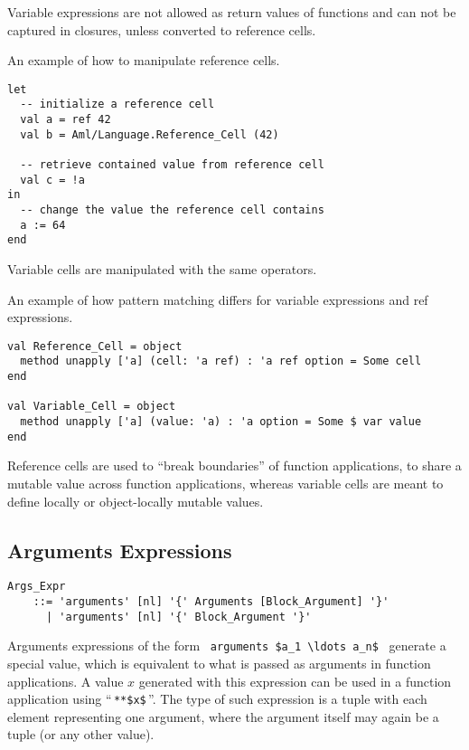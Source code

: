 Variable expressions are not allowed as return values of functions and can not be captured in closures, unless converted to reference cells. 

\example An example of how to manipulate reference cells. 
\begin{lstlisting}
let 
  -- initialize a reference cell
  val a = ref 42
  val b = Aml/Language.Reference_Cell (42)

  -- retrieve contained value from reference cell
  val c = !a
in
  -- change the value the reference cell contains
  a := 64
end
\end{lstlisting}
Variable cells are manipulated with the same operators. 

\example An example of how pattern matching differs for variable expressions and ref expressions. 
\begin{lstlisting}[mathescape=false]
val Reference_Cell = object 
  method unapply ['a] (cell: 'a ref) : 'a ref option = Some cell
end

val Variable_Cell = object
  method unapply ['a] (value: 'a) : 'a option = Some $ var value
end
\end{lstlisting}
Reference cells are used to ``break boundaries'' of function applications, to share a mutable value across function applications, whereas variable cells are meant to define locally or object-locally mutable values.





\subsection{Arguments Expressions}
\label{sec:arguments-expressions}

\grammar\begin{lstlisting}
Args_Expr 
    ::= 'arguments' [nl] '{' Arguments [Block_Argument] '}' 
      | 'arguments' [nl] '{' Block_Argument '}'
\end{lstlisting}

Arguments expressions of the form ~\lstinline!arguments $a_1 \ldots a_n$!~ generate a special value, which is equivalent to what is passed as arguments in function applications. A value $x$ generated with this expression can be used in a function application using ``\,\lstinline!**$x$!\,''. The type of such expression is a tuple with each element representing one argument, where the argument itself may again be a tuple (or any other value). 





